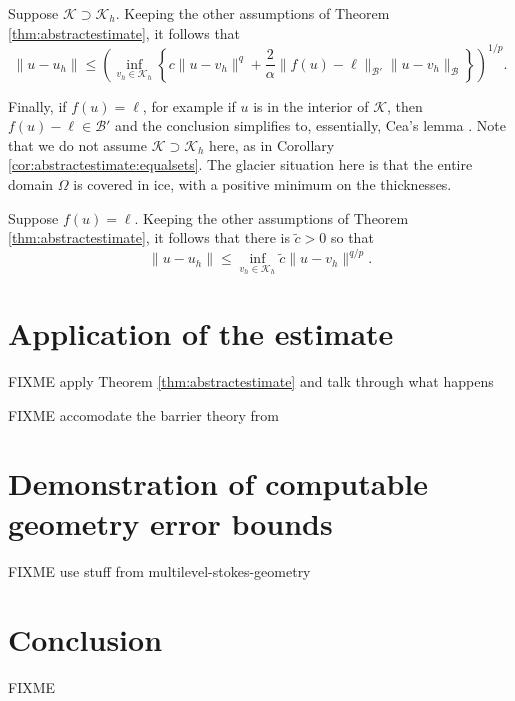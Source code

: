 \documentclass[hidelinks,onefignum,onetabnum,final]{siamart220329}  %
\newcommand{\cB}{\mathcal{B}}
\newcommand{\cK}{\mathcal{K}}
\begin{document}
\begin{corollary}  \label{cor:abstractestimate:equalsets}
Suppose $\cK \supset \cK_h$.  Keeping the other assumptions of Theorem \ref{thm:abstractestimate}, it follows that
\begin{equation}
\|u-u_h\| \le \left(\inf_{v_h\in\cK_h} \left\{c \|u - v_h\|^q + \frac{2}{\alpha} \|f(u)-\ell\|_{\cB'} \|u-v_h\|_{\cB}\right\}\right)^{1/p}. \label{eq:abstractestimate:equalsets}
\end{equation}
\end{corollary}

Finally, if $f(u)=\ell$, for example if $u$ is in the interior of $\cK$, then $f(u)-\ell \in \cB'$ and the conclusion simplifies to, essentially, Cea's lemma \cite{Ciarlet2002}.  Note that we do not assume $\cK \supset \cK_h$ here, as in Corollary \ref{cor:abstractestimate:equalsets}.  The glacier situation here is that the entire domain $\Omega$ is covered in ice, with a positive minimum on the thicknesses.

\begin{corollary}  \label{cor:abstractestimate:interior}
Suppose $f(u)=\ell$.  Keeping the other assumptions of Theorem \ref{thm:abstractestimate}, it follows that there is $\tilde c>0$ so that
\begin{equation}
\|u-u_h\| \le \inf_{v_h\in\cK_h} \tilde c \|u - v_h\|^{q/p}. \label{eq:abstractestimate:interior}
\end{equation}
\end{corollary}


\section{Application of the estimate} \label{sec:application}

FIXME apply Theorem \ref{thm:abstractestimate} and talk through what happens

FIXME accomodate the barrier theory from \cite{Bueler2021conservation}


\section{Demonstration of computable geometry error bounds} \label{sec:demo}

FIXME use stuff from multilevel-stokes-geometry


\section{Conclusion} \label{sec:conclusion}

FIXME




\end{document}
